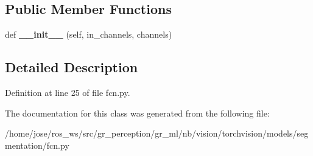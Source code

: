 \subsection*{Public Member Functions}
\begin{DoxyCompactItemize}
\item 
\mbox{\label{classtorchvision_1_1models_1_1segmentation_1_1fcn_1_1FCNHead_aacca49d4b12656bce1053a1d9d68d720}} 
def {\bfseries \+\_\+\+\_\+init\+\_\+\+\_\+} (self, in\+\_\+channels, channels)
\end{DoxyCompactItemize}


\subsection{Detailed Description}


Definition at line 25 of file fcn.\+py.



The documentation for this class was generated from the following file\+:\begin{DoxyCompactItemize}
\item 
/home/jose/ros\+\_\+ws/src/gr\+\_\+perception/gr\+\_\+ml/nb/vision/torchvision/models/segmentation/fcn.\+py\end{DoxyCompactItemize}
